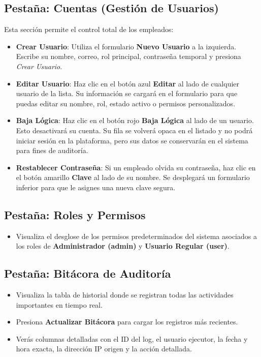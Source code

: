 \documentclass[11pt,a4paper]{article}
\begin{document}
\subsection{Pestaña: Cuentas (Gestión de Usuarios)}
Esta sección permite el control total de los empleados:
\begin{itemize}
    \item \textbf{Crear Usuario}: Utiliza el formulario \textbf{Nuevo Usuario} a la izquierda. Escribe su nombre, correo, rol principal, contraseña temporal y presiona \textit{Crear Usuario}.
    \item \textbf{Editar Usuario}: Haz clic en el botón azul \textbf{Editar} al lado de cualquier usuario de la lista. Su información se cargará en el formulario para que puedas editar su nombre, rol, estado activo o permisos personalizados.
    \item \textbf{Baja Lógica}: Haz clic en el botón rojo \textbf{Baja Lógica} al lado de un usuario. Esto desactivará su cuenta. Su fila se volverá opaca en el listado y no podrá iniciar sesión en la plataforma, pero sus datos se conservarán en el sistema para fines de auditoría.
    \item \textbf{Restablecer Contraseña}: Si un empleado olvida su contraseña, haz clic en el botón amarillo \textbf{Clave} al lado de su nombre. Se desplegará un formulario inferior para que le asignes una nueva clave segura.
\end{itemize}

\subsection{Pestaña: Roles y Permisos}
\begin{itemize}
    \item Visualiza el desglose de los permisos predeterminados del sistema asociados a los roles de \textbf{Administrador (admin)} y \textbf{Usuario Regular (user)}.
\end{itemize}

\subsection{Pestaña: Bitácora de Auditoría}
\begin{itemize}
    \item Visualiza la tabla de historial donde se registran todas las actividades importantes en tiempo real.
    \item Presiona \textbf{Actualizar Bitácora} para cargar los registros más recientes.
    \item Verás columnas detalladas con el ID del log, el usuario ejecutor, la fecha y hora exacta, la dirección IP origen y la acción detallada.
\end{itemize}
\end{document}
